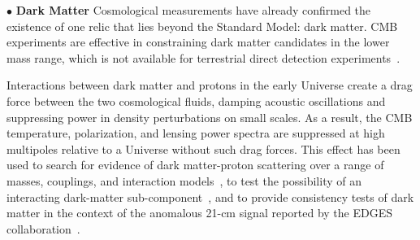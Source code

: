 \documentclass[PICOReport.tex]{subfiles}
\begin{document}

\noindent$\bullet$ {\bf Dark Matter} \hspace{0.1in} Cosmological measurements have already confirmed the existence of one relic that lies beyond the Standard Model: dark matter. \ac{CMB} experiments are effective in constraining dark matter candidates in the lower mass range, which is not available for terrestrial direct detection experiments~\citep{Madhavacheril:2013cna,Green:2018pmd}. 

Interactions between dark matter and protons in the early Universe create a drag force between the two cosmological fluids, damping acoustic oscillations and suppressing power in density perturbations on small scales. As a result, the CMB temperature, polarization, and lensing power spectra are suppressed at high multipoles relative to a Universe without such drag forces.  This effect has been used to search for evidence of dark matter-proton scattering over a range of masses, couplings, and interaction models~\citep{2002astro.ph..2496C, 2004PhRvD..70h3501S, Dvorkin:2013cea, 2018PhRvL.121h1301G,2018arXiv180108609B, 2018PhRvD..97j3530X, 2018arXiv180800001B, 2018PhRvD..98b3013S}, to test the possibility of an interacting dark-matter sub-component~\citep{2018arXiv180800001B}, and to provide consistency tests of dark matter in the context of the anomalous 21-cm signal reported by the EDGES collaboration~\citep{2018Natur.555...71B,2018Natur.555...67B,2018arXiv180800001B,2018arXiv180711482K}.


 
\end{document}

